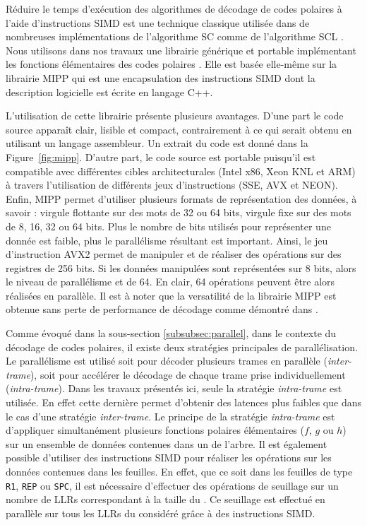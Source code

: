 Réduire le temps d'exécution des algorithmes de décodage de codes polaires à l'aide d'instructions SIMD est une technique classique utilisée dans de nombreuses implémentations de l'algorithme SC \cite{sarkis_fast_2014,giard_fast_2014,giard_low-latency_2016,sarkis_autogenerating_2014,gal_software_2014,cassagne_efficient_2015,cassagne_energy_2016,gal_multi-gb/s_2015} comme de l'algorithme SCL \cite{sarkis_fast_2016,sarkis_increasing_2014,shen_low-latency_2016}. Nous utilisons dans nos travaux une librairie générique et portable implémentant les fonctions élémentaires des codes polaires \cite{cassagne_efficient_2015}. Elle est basée elle-même sur la librairie MIPP \cite{cassagne2018mipp} qui est une encapsulation des instructions SIMD dont la description logicielle est écrite en langage C++.

L'utilisation de cette librairie présente plusieurs avantages. D'une part le code source apparaît clair, lisible et compact, contrairement à ce qui serait obtenu en utilisant un langage assembleur. Un extrait du code est donné dans la Figure~\ref{fig:mipp}. D'autre part, le code source est portable puisqu'il est compatible avec différentes cibles architecturales (Intel x86, Xeon KNL et ARM) à travers l'utilisation de différents jeux d'instructions (SSE, AVX et NEON). Enfin, MIPP permet d'utiliser plusieurs formats de représentation des données, à savoir : virgule flottante sur des mots de 32 ou 64 bits, virgule fixe sur des mots de 8, 16, 32 ou 64 bits. Plus le nombre de bits utilisés pour représenter une donnée est faible, plus le parallélisme résultant est important. Ainsi, le jeu d'instruction AVX2 permet de manipuler et de réaliser des opérations sur des registres de 256 bits. Si les données manipulées sont représentées sur 8 bits, alors le niveau de parallélisme et de 64. En clair, 64 opérations peuvent être alors réalisées en parallèle. Il est à noter que la versatilité de la librairie MIPP est obtenue sans perte de performance de décodage comme démontré dans \cite{cassagne2018mipp}.

Comme évoqué dans la sous-section \ref{subsubsec:parallel}, dans le contexte du décodage de codes polaires, il existe deux stratégies principales de parallélisation. Le parallélisme est utilisé soit pour décoder plusieurs trames en parallèle (\textit{inter-trame}), soit pour accélérer le décodage de chaque trame prise individuellement (\textit{intra-trame}). Dans les travaux présentés ici, seule la stratégie \textit{intra-trame} est utilisée. En effet cette dernière permet d'obtenir des latences plus faibles que dans le cas d'une stratégie \textit{inter-trame}. Le principe de la stratégie \textit{intra-trame} est d'appliquer simultanément plusieurs fonctions polaires élémentaires ($f$, $g$ ou $h$) sur un ensemble de données contenues dans un \noeud de l'arbre. Il est également possible d'utiliser des instructions SIMD pour réaliser les opérations sur les données contenues dans les feuilles. En effet, que ce soit dans les feuilles de type \texttt{R1}, \texttt{REP} ou \texttt{SPC}, il est nécessaire d'effectuer des opérations de seuillage sur un nombre de LLRs correspondant à la taille du \noeud. Ce seuillage est effectué en parallèle sur tous les LLRs du \noeud considéré grâce à des instructions SIMD.

